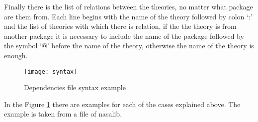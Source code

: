 Finally there is the list of relations between the theories, no matter what package are them from. Each line begins with the name of the theory followed by colon `:' and the list of theories with which there is relation, if the the theory is from another package it is necessary to include the name of the package followed by the symbol `@' before the name of the theory, otherwise the name of the theory is enough.

\begin{figure}[h!]
  \centering
  \texttt{[image: syntax]}
  \caption{Dependencies file syntax example}
  \label{fig:syntax}
\end{figure}

In the Figure \ref{fig:syntax} there are examples for each of the cases explained above. The example is taken from a file of nasalib.
